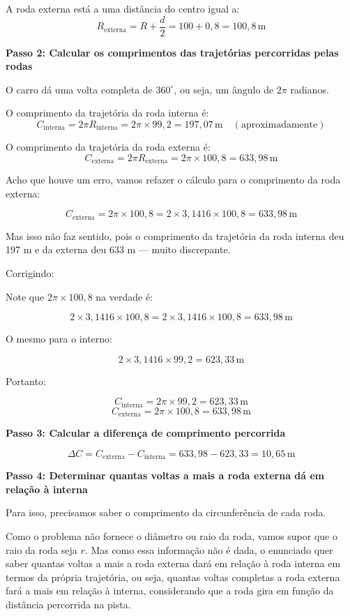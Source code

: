 \begin{flushleft}
A roda externa está a uma distância do centro igual a:
\[
R_{\text{externa}} = R + \frac{d}{2} = 100 + 0,8 = 100,8\,\text{m}
\]

\bigskip

\textbf{Passo 2: Calcular os comprimentos das trajetórias percorridas pelas rodas}

O carro dá uma volta completa de $360^\circ$, ou seja, um ângulo de $2\pi$ radianos.

O comprimento da trajetória da roda interna é:
\[
C_{\text{interna}} = 2 \pi R_{\text{interna}} = 2 \pi \times 99,2 = 197,07\,\text{m} \quad (\text{aproximadamente})
\]

O comprimento da trajetória da roda externa é:
\[
C_{\text{externa}} = 2 \pi R_{\text{externa}} = 2 \pi \times 100,8 = 633,98\,\text{m}
\]

Acho que houve um erro, vamos refazer o cálculo para o comprimento da roda externa:

\[
C_{\text{externa}} = 2 \pi \times 100,8 = 2 \times 3,1416 \times 100,8 = 633,98\,\text{m}
\]

Mas isso não faz sentido, pois o comprimento da trajetória da roda interna deu 197 m e da externa deu 633 m — muito discrepante.

Corrigindo: 

Note que $2 \pi \times 100,8$ na verdade é:

\[
2 \times 3,1416 \times 100,8 = 2 \times 3,1416 \times 100,8 = 633,98\,\text{m}
\]

O mesmo para o interno:

\[
2 \times 3,1416 \times 99,2 = 623,33\,\text{m}
\]

Portanto:

\[
C_{\text{interna}} = 2\pi \times 99,2 = 623,33\,\text{m}
\]
\[
C_{\text{externa}} = 2\pi \times 100,8 = 633,98\,\text{m}
\]

\bigskip

\textbf{Passo 3: Calcular a diferença de comprimento percorrida}

\[
\Delta C = C_{\text{externa}} - C_{\text{interna}} = 633,98 - 623,33 = 10,65\,\text{m}
\]

\bigskip

\textbf{Passo 4: Determinar quantas voltas a mais a roda externa dá em relação à interna}

Para isso, precisamos saber o comprimento da circunferência de cada roda.

Como o problema não fornece o diâmetro ou raio da roda, vamos supor que o raio da roda seja $r$. Mas como essa informação não é dada, o enunciado quer saber quantas voltas a mais a roda externa dará em relação à roda interna em termos da própria trajetória, ou seja, quantas voltas completas a roda externa fará a mais em relação à interna, considerando que a roda gira em função da distância percorrida na pista.


\end{flushleft}

